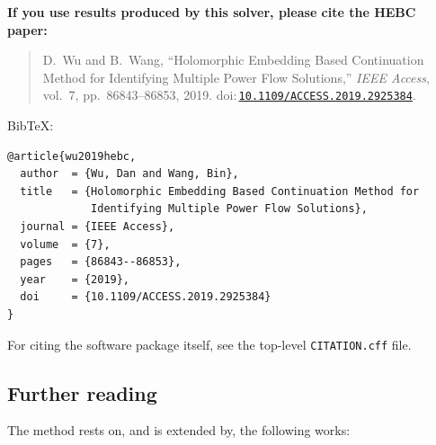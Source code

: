 \documentclass[11pt,a4paper]{article}
\newcommand{\doi}[1]{\href{https://doi.org/#1}{\nolinkurl{#1}}}
\newcommand{\code}[1]{\texttt{#1}}
\begin{document}
\textbf{If you use results produced by this solver, please cite the HEBC paper:}
\begin{quote}
D.\ Wu and B.\ Wang, ``Holomorphic Embedding Based Continuation Method for Identifying
Multiple Power Flow Solutions,'' \emph{IEEE Access}, vol.~7, pp.~86843--86853, 2019.
doi:\,\doi{10.1109/ACCESS.2019.2925384}.
\end{quote}

BibTeX:
\begin{lstlisting}[style=sh]
@article{wu2019hebc,
  author  = {Wu, Dan and Wang, Bin},
  title   = {Holomorphic Embedding Based Continuation Method for
             Identifying Multiple Power Flow Solutions},
  journal = {IEEE Access},
  volume  = {7},
  pages   = {86843--86853},
  year    = {2019},
  doi     = {10.1109/ACCESS.2019.2925384}
}
\end{lstlisting}

For citing the software package itself, see the top-level \code{CITATION.cff} file.

\subsection*{Further reading}
The method rests on, and is extended by, the following works:
\end{document}
